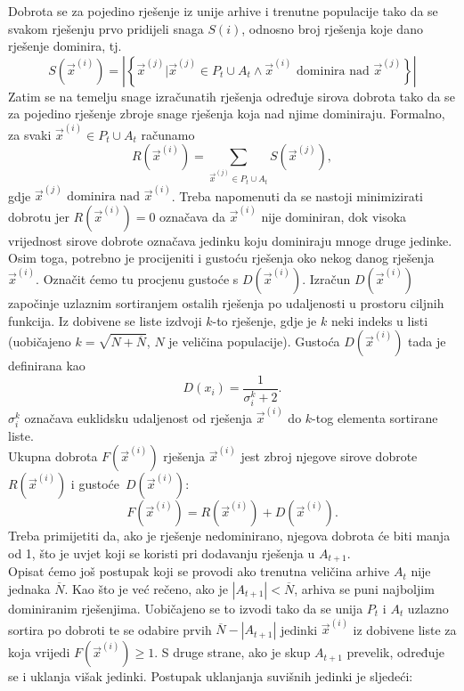 \documentclass[times, utf8, zavrsni, numeric]{fer}
\begin{document}
Dobrota se za pojedino rješenje iz unije arhive i trenutne populacije tako da se svakom rješenju prvo pridijeli snaga  $S(i)$, odnosno broj rješenja koje dano rješenje dominira, tj. 	
\begin{equation*}
S(\vec{x}^{(i)}) = \left\vert{\left\lbrace \vec{x}^{(j)} \vert \vec{x}^{(j)} \in P_t \cup A_t \land \vec{x}^{(i)} \mbox{ dominira nad } \vec{x}^{(j)} \right\rbrace}\right\vert
\end{equation*}
Zatim se na temelju snage izračunatih rješenja određuje sirova dobrota  tako da se za pojedino rješenje zbroje snage rješenja koja nad njime dominiraju. Formalno, za svaki $\vec{x}^{(i)} \in P_t \cup A_t$ računamo
\begin{equation*}
R(\vec{x}^{(i)}) = \sum_{\vec{x}^{(j)} \in P_t \cup A_t}S(\vec{x}^{(j)}),
\end{equation*}
gdje $\vec{x}^{(j)} \mbox{ dominira nad } \vec{x}^{(i)}$. Treba napomenuti da se nastoji minimizirati dobrotu jer $R(\vec{x}^{(i)}) = 0$ označava da $\vec{x}^{(i)}$ nije dominiran, dok visoka vrijednost sirove dobrote označava jedinku koju dominiraju mnoge druge jedinke.\\
Osim toga, potrebno je procijeniti i gustoću rješenja oko nekog danog rješenja $\vec{x}^{(i)}$. Označit ćemo tu procjenu gustoće s $D(\vec{x}^{(i)})$. Izračun $D(\vec{x}^{(i)})$ započinje uzlaznim sortiranjem ostalih rješenja po udaljenosti u prostoru ciljnih funkcija. Iz dobivene se liste izdvoji $k$-to rješenje, gdje je $k$ neki indeks u listi (uobičajeno $k = \sqrt{N + \overline{N}}$, $N$ je veličina populacije). Gustoća $D(\vec{x}^{(i)})$ tada je definirana kao
\begin{equation*}
D(x_i) = \frac{1}{\sigma_i^k + 2}.
\end{equation*}
$\sigma_i^k$ označava euklidsku udaljenost od rješenja $\vec{x}^{(i)}$ do $k$-tog elementa sortirane liste.\\
Ukupna dobrota $F(\vec{x}^{(i)})$ rješenja $\vec{x}^{(i)}$ jest zbroj njegove sirove dobrote $R(\vec{x}^{(i)})$ i gustoće~$D(\vec{x}^{(i)})$:
\begin{equation*}
F(\vec{x}^{(i)}) = R(\vec{x}^{(i)}) + D(\vec{x}^{(i)}).
\end{equation*}
Treba primijetiti da, ako je rješenje nedominirano, njegova dobrota će biti manja od 1, što je uvjet koji se koristi pri dodavanju rješenja u $A_{t+1}$.\\
Opisat ćemo još postupak koji se provodi ako trenutna veličina arhive $A_t$ nije jednaka $\overline{N}$. Kao što je već rečeno, ako je $\left\vert A_{t+1} \right\vert < \overline{N}$, arhiva se puni najboljim dominiranim rješenjima. Uobičajeno se to izvodi tako da se unija $P_t$ i $A_t$ uzlazno sortira po dobroti te se odabire prvih $\overline{N} - \left\vert A_{t+1} \right\vert$ jedinki $\vec{x}^{(i)}$ iz dobivene liste za koja  vrijedi $F(\vec{x}^{(i)}) \geq 1$. S druge strane, ako je skup $A_{t+1}$ prevelik, određuje se i uklanja višak jedinki. Postupak uklanjanja suvišnih jedinki je sljedeći:
\end{document}
